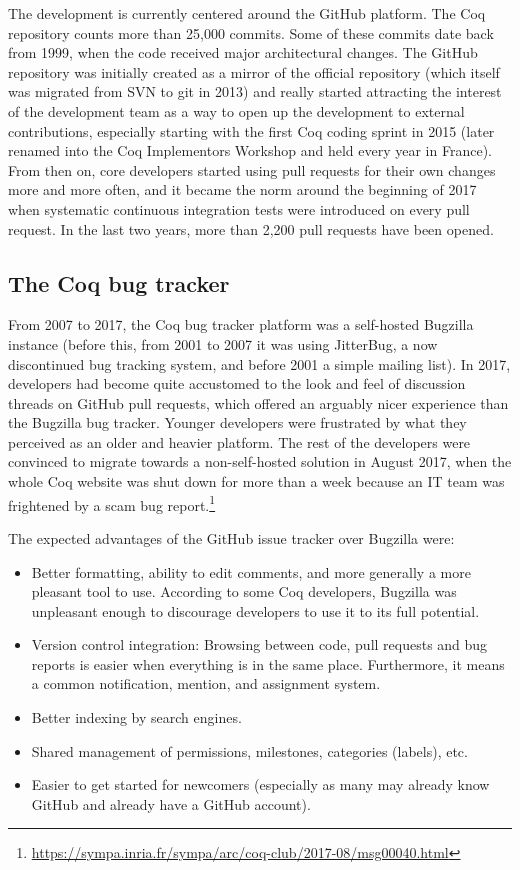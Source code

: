 \documentclass[conference]{IEEEtran}
\begin{document}

The development is currently centered around the GitHub platform. The Coq repository counts more than 25,000 commits. Some of these commits date back from 1999, when the code received major architectural changes. The GitHub repository was initially created as a mirror of the official repository (which itself was migrated from SVN to git in 2013) and really started attracting the interest of the development team as a way to open up the development to external contributions, especially starting with the first Coq coding sprint in 2015 (later renamed into the Coq Implementors Workshop and held every year in France). From then on, core developers started using pull requests for their own changes more and more often, and it became the norm around the beginning of 2017 when systematic continuous integration tests were introduced on every pull request. In the last two years, more than 2,200 pull requests have been opened.

\subsection{The Coq bug tracker}

From 2007 to 2017, the Coq bug tracker platform was a self-hosted Bugzilla instance (before this, from 2001 to 2007 it was using JitterBug, a now discontinued bug tracking system, and before 2001 a simple mailing list). In 2017, developers had become quite accustomed to the look and feel of discussion threads on GitHub pull requests, which offered an arguably nicer experience than the Bugzilla bug tracker. Younger developers were frustrated by what they perceived as an older and heavier platform. The rest of the developers were convinced to migrate towards a non-self-hosted solution in August 2017, when the whole Coq website was shut down for more than a week  because an IT team was frightened by a scam bug report.\footnote{\url{https://sympa.inria.fr/sympa/arc/coq-club/2017-08/msg00040.html}}

The expected advantages of the GitHub issue tracker over Bugzilla were:
\begin{itemize}
\item Better formatting, ability to edit comments, and more generally a more pleasant tool to use. According to some Coq developers, Bugzilla was unpleasant enough to discourage developers to use it to its full potential.
\item Version control integration: Browsing between code, pull requests and bug reports is easier when everything is in the same place. Furthermore, it means a common notification, mention, and assignment system.
\item Better indexing by search engines.
\item Shared management of permissions, milestones, categories (labels), etc.
\item Easier to get started for newcomers (especially as many may already know GitHub and already have a GitHub account).
\end{itemize}
\end{document}
